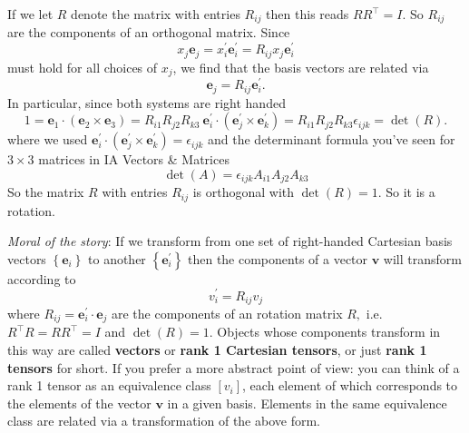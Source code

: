 If we let $R$ denote the matrix with entries $R_{i j}$ then this reads $RR^{\top}=I .$ So $R_{i j}$ are the components of an orthogonal matrix. Since
\[
x_{j} \mathbf{e}_{j}=x_{i}^{\prime} \mathbf{e}_{i}^{\prime}=R_{i j} x_{j} \mathbf{e}_{i}^{\prime}
\]
must hold for all choices of $x_{j}$, we find that the basis vectors are related via
\[
\mathbf{e}_{j}=R_{i j} \mathbf{e}_{i}^{\prime}.
\]
In particular, since both systems are right handed
\[
1=\mathbf{e}_{1} \cdot\left(\mathbf{e}_{2} \times \mathbf{e}_{3}\right)=R_{i 1} R_{j 2} R_{k 3}\ \mathbf{e}_{i}^{\prime} \cdot\left(\mathbf{e}_{j}^{\prime} \times \mathbf{e}_{k}^{\prime}\right)=R_{i 1} R_{j 2} R_{k 3} \epsilon_{i j k}=\operatorname{det}(R).
\]
where we used $\mathbf{e}_{i}^{\prime} \cdot\left(\mathbf{e}_{j}^{\prime} \times \mathbf{e}_{k}^{\prime}\right)=\epsilon_{i j k}$ and the determinant formula you've seen for $3 \times 3$ matrices in IA Vectors \& Matrices
\[
\operatorname{det}(A)=\epsilon_{i j k} A_{i 1} A_{j 2} A_{k 3}
\]
So the matrix $R$ with entries $R_{i j}$ is orthogonal with $\operatorname{det}(R)=1 .$ So it is a rotation. 

\textit{Moral of the story}: If we transform from one set of right-handed Cartesian basis vectors $\left\{\mathbf{e}_{i}\right\}$ to another $\left\{\mathbf{e}_{i}^{\prime}\right\}$ then the components of a vector $\mathbf{v}$ will transform according to
\[
    \boxed{v_{i}^{\prime}=R_{i j} v_{j}}
\]
where $R_{i j}=\mathbf{e}_{i}^{\prime} \cdot \mathbf{e}_{j}$ are the components of an rotation matrix $R,$ i.e. $R^{\top} R=RR^{\top}=I$
and $\operatorname{det}(R)=1$. Objects whose components transform in this way are called \textbf{vectors} or \textbf{rank 1 Cartesian tensors}, or just \textbf{rank 1 tensors} for short. If you prefer a more abstract point of view: you can think of a rank 1 tensor as an equivalence class $\left[v_{i}\right]$, each element of which corresponds to the elements of the vector $\mathbf{v}$ in a given basis. Elements in the same equivalence class are related via a transformation of the above form.

